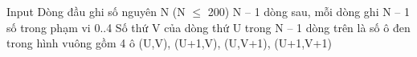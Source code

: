 Input
Dòng đầu ghi số nguyên N (N $\le$ 200)  N – 1 dòng sau, mỗi dòng ghi N – 1 số trong phạm vi 0..4  Số thứ V của dòng thứ U trong N – 1 dòng trên là số ô đen trong hình vuông gồm 4 ô (U,V), (U+1,V), (U,V+1), (U+1,V+1)
